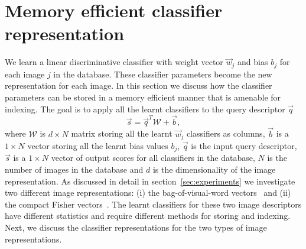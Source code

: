 		 

  \section{Memory efficient classifier representation}  
  \label{sec:memory}
  
  We learn a linear discriminative classifier with weight vector $\vec{w}_j$ and bias $b_j$ for each image $j$ in the database.   
  These classifier parameters become the new representation for each image. 
  In this section we discuss how the classifier parameters can be stored in a memory efficient manner that is amenable for indexing. 
  The goal is to apply all the learnt classifiers to the query descriptor $\vec{q}$
      \begin{equation}
      \label{eq:allscores}
        \vec{s}=\vec{q}^T \mathcal{W}+\vec{b}, %
      \end{equation}
  where $\mathcal{W}$ is $d\times N$ matrix storing all the learnt $\vec{w}_j$ classifiers as columns, $\vec{b}$ is a $1\times N$ vector storing all the learnt bias values $b_j$, 
  $\vec{q}$ is the input query descriptor, $\vec{s}$ is a $1\times N$ vector of output scores for all classifiers in the database, $N$ is the number of images in the database  and $d$ is the dimensionality of the image representation. 
  As discussed in detail in section~\ref{sec:experiments} we investigate two different image representations:  (i) the bag-of-visual-word vectors~\cite{Sivic03} and (ii) the compact Fisher vectors~\cite{Jegou12}. The learnt classifiers for these two image descriptors have different statistics and require different methods for storing and indexing. Next, we discuss the classifier representations for the two types of image representations.
 
